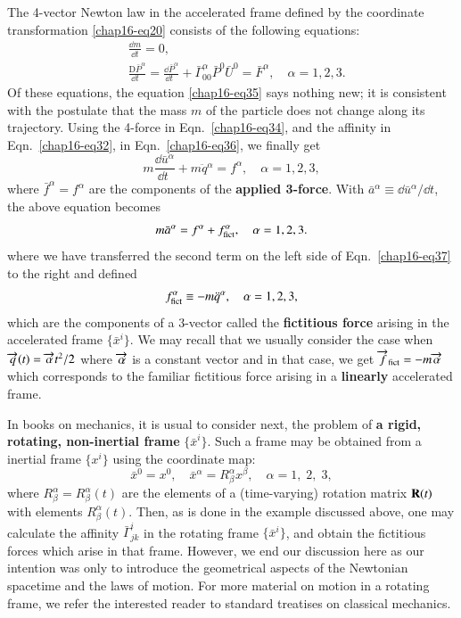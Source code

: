 The 4-vector Newton law in the accelerated frame  defined by the coordinate transformation \eqref{chap16-eq20} consists of the following equations: 
\begin{align}
&\frac{\dd m}{\dd t}=0,\label{chap16-eq35}\\
&\frac{\mathrm{D} {\bar{P}}^\alpha}{\dd t\;\:}= \frac{\dd \bar{P}^\alpha}{\dd t\;\:} + \bar{\Gamma}^\alpha_{00} \bar{P}^0 \bar{U}^0= {\bar{F}^\alpha},\quad \alpha=1,2,3. \label{chap16-eq36}
\end{align} 
Of these equations, the equation \eqref{chap16-eq35} says nothing new; it  is consistent with the postulate  that the mass $m$ of the  particle does not change along its trajectory. Using the 4-force in Eqn.~\eqref{chap16-eq34}, and the affinity in Eqn.~\eqref{chap16-eq32}, in Eqn.~\eqref{chap16-eq36}, we finally get
\begin{equation}
m\frac{\dd \bar{u}^\alpha}{\dd t\;}+m{\ddot{q}}{}^\alpha= f^\alpha, \quad \alpha=1,2,3,\label{chap16-eq37}
\end{equation}
where $\bar{f}^{\alpha}={f}^{\alpha}$ are the components of the \textbf{applied 3-force}. With $\bar{a}^\alpha\equiv{\dd \bar{u}^\alpha/\dd t}$, the above equation becomes
\begin{equation}
m\bar{a}^\alpha= f^\alpha+ f_{\rm{fict}}^\alpha,\quad \alpha=1,2,3.\label{chap16-eq38}
\end{equation}
where we have transferred the second term on the left side of Eqn.~\eqref{chap16-eq37} to the right and defined
\begin{equation}
f_{\rm{fict}}^\alpha \equiv -m\ddot{q}^\alpha,\quad \alpha=1,2,3,\label{chap16-eq39}
\end{equation}
which are the components of a 3-vector called the \textbf{fictitious force} arising in the  accelerated frame $\{\bar{x}^i \}$. We may recall that we usually consider the case  when $\overrightarrow{q}(t)=\overrightarrow{\alpha} t^2/2$ where $\overrightarrow{\alpha}$ is a constant vector and in that  case, we get $\overrightarrow{f}_{\rm{fict}}=-m\overrightarrow{\alpha}$ which corresponds to  the familiar fictitious force arising in a \textbf{linearly} accelerated frame.

In books on mechanics, it is usual to consider next, the problem of \textbf{a rigid, rotating, non-inertial frame} $\{\bar{x}^i\}$. Such a frame may be obtained from a inertial frame  $\{ x^i\}$ using the coordinate map:
\begin{equation}
\bar{x}^0=x^0, \quad \bar{x}^\alpha={R}^{\alpha}_{\beta} {x}^{\beta}, \quad \alpha=1,\;2,\;3,\label{chap16-eq40}
\end{equation}
where  ${R}^{\alpha}_{\beta}={R}^{\alpha}_{\beta}(t)$ are the elements of a (time-varying) rotation matrix ${\mathbf{R}} (t)$ with elements ${R}^{\alpha}_{\beta}(t)$. Then, as is done in the example discussed above, one may calculate the affinity $\bar{\Gamma}^i_{jk}$ in the rotating frame $\{\bar{x}^i\}$, and obtain the fictitious forces which arise in that frame. However, we end our discussion here as our intention was only to introduce the geometrical aspects of the Newtonian spacetime and the  laws of motion. For more material on motion in a rotating frame, we refer the interested reader to standard treatises on classical mechanics.


